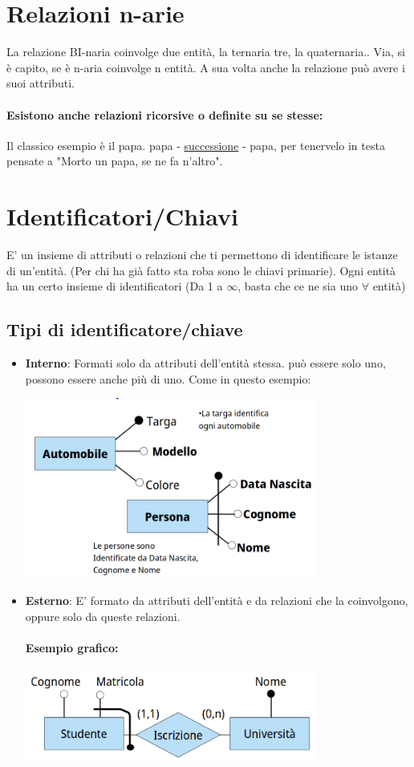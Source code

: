 \documentclass[12pt, a4paper, openany, twoside]{book}
\begin{document}
\section{Relazioni n-arie}
La relazione BI-naria coinvolge due entità, la ternaria tre, la quaternaria.. 
Via, si è capito, se è n-aria coinvolge n entità. A sua volta anche la relazione
può avere i suoi attributi.
\paragraph{Esistono anche relazioni ricorsive o definite su se stesse:} Il classico
esempio è il papa. papa - \underline{successione} - papa, per tenervelo in testa
pensate a "Morto un papa, se ne fa n'altro".
\section{Identificatori/Chiavi}
E' un insieme di attributi o relazioni che ti permettono di identificare le
istanze di un'entità. (Per chi ha già fatto sta roba sono le chiavi primarie).
Ogni entità ha un certo insieme di identificatori (Da 1 a $\infty$, basta che
ce ne sia uno $\forall$ entità)
\subsection{Tipi di identificatore/chiave}
\begin{itemize}
	\item \textbf{Interno}: Formati solo da attributi dell'entità stessa. può 
	essere solo uno, possono essere anche più di uno. Come in questo esempio:
	\begin{center}
	\includegraphics[width=0.75\textwidth]{6.png}
	\end{center}

	\item \textbf{Esterno}: E' formato da attributi dell'entità e da relazioni
	che la coinvolgono, oppure solo da queste relazioni.
	\paragraph{Esempio grafico:}
	\begin{center}
	\includegraphics[width=0.75\textwidth]{7.png}
	\end{center}
\end{itemize}
\end{document}
